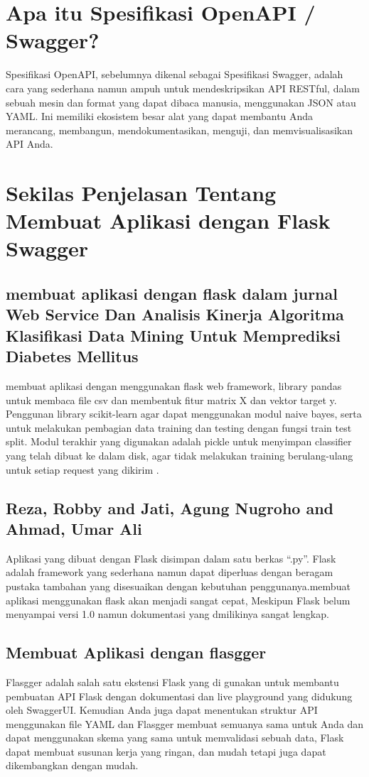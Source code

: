 \section{Apa itu Spesifikasi OpenAPI / Swagger?}
Spesifikasi OpenAPI, sebelumnya dikenal sebagai Spesifikasi Swagger, adalah cara yang sederhana namun ampuh untuk mendeskripsikan API RESTful, dalam sebuah mesin dan format yang dapat dibaca manusia, menggunakan JSON atau YAML. Ini memiliki ekosistem besar alat yang dapat membantu Anda merancang, membangun, mendokumentasikan, menguji, dan memvisualisasikan API Anda.


\section{Sekilas Penjelasan Tentang Membuat Aplikasi dengan Flask Swagger}

\subsection{membuat aplikasi dengan flask dalam jurnal Web Service Dan  Analisis Kinerja Algoritma Klasifikasi Data Mining Untuk Memprediksi Diabetes Mellitus}
membuat aplikasi dengan menggunakan flask web framework, library pandas untuk membaca file csv dan membentuk fitur matrix X dan vektor target y. Penggunan library scikit-learn agar dapat menggunakan modul naive bayes, serta untuk melakukan pembagian data training dan testing dengan fungsi train test split. Modul terakhir yang digunakan adalah pickle untuk menyimpan classifier yang telah dibuat ke dalam disk, agar tidak melakukan training berulang-ulang untuk setiap request yang dikirim \cite{setyawan2017implementasi}. 

\subsection{Reza, Robby and Jati, Agung Nugroho and Ahmad, Umar Ali}
Aplikasi yang dibuat dengan Flask disimpan dalam satu berkas “.py”. Flask adalah framework yang sederhana namun dapat diperluas dengan beragam pustaka tambahan yang disesuaikan dengan kebutuhan penggunanya.membuat aplikasi menggunakan flask akan menjadi sangat cepat, Meskipun Flask belum menyampai versi 1.0 namun dokumentasi yang dmilikinya sangat lengkap\cite{reza2016perancangan}. 

\subsection{Membuat Aplikasi dengan flasgger}
Flasgger adalah salah satu ekstensi Flask yang di gunakan untuk membantu pembuatan API Flask dengan dokumentasi dan live playground yang didukung oleh SwaggerUI. Kemudian Anda juga dapat menentukan struktur API menggunakan file YAML dan Flasgger membuat semuanya sama untuk Anda dan dapat menggunakan skema yang sama untuk memvalidasi sebuah data, Flask dapat membuat susunan kerja yang ringan, dan mudah tetapi juga dapat dikembangkan dengan mudah\cite{gunawan2018aplikasi}.


